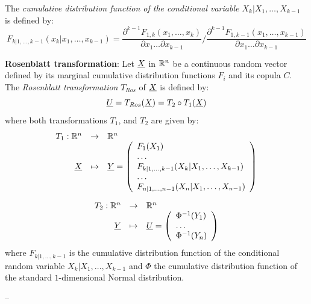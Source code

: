 {  The \emph{cumulative distribution function of the conditional variable  $X_k|X_1, \dots, X_{k-1}$} is defined by:
  \begin{equation}
    F_{k|1, \dots, k-1} (x_k|x_1, \dots, x_{k-1})   =  \displaystyle \frac{\partial^{k-1} F_{1,k}(x_1, \dots, x_k)}{\partial x_1 \dots \partial x_{k-1}} /\frac{\partial^{k-1} F_{1,k-1}(x_1, \dots, x_{k-1})} {\partial x_1 \dots \partial x_{k-1}}
  \end{equation}

  {\bf Rosenblatt transformation}:  Let ${\underline{X}}$ in ${\mathbb R}^n$ be a continuous random vector defined by its marginal cumulative distribution functions $F_i$ and its  copula  $C$. The \emph{Rosenblatt transformation} $T_{Ros}$ of ${\underline{X}}$ is  defined by:
  \begin{equation}\label{usualRos}
    {\underline{U}} = T_{Ros}({\underline{X}})=T_2\circ T_1({\underline{X}})
  \end{equation}
  where both transformations $T_1$, and $T_2$  are given by:
  \begin{equation}\label{usualRosDetailed}
    \begin{array}{rcl}
      T_1 : {\mathbb R}^n & \rightarrow & {\mathbb R}^n\\
      {\underline{X}} & \mapsto & {\underline{Y}}=
      \left(
      \begin{array}{l}
        F_1(X_1)\\
        \dots \\
        F_{k|1, \dots, k-1}(X_k|X_1, \dots, X_{k-1})\\
        \dots \\
        F_{n|1, \dots, n-1}(X_n|X_1, \dots, X_{n-1})
      \end{array}
      \right)
    \end{array}
  \end{equation}

  \begin{equation}\label{usualRosDetailed2}
    \begin{array}{rcl}
      T_2 : {\mathbb R}^n & \rightarrow & {\mathbb R}^n\\
      {\underline{Y}} & \mapsto & {\underline{U}}=
      \left(
      \begin{array}{l}
        \Phi^{-1}(Y_1)\\
        \dots \\
        \Phi^{-1}(Y_n)
      \end{array}
      \right)
    \end{array}
  \end{equation}
  where $F_{k|1, \dots, k-1}$ is the cumulative distribution function of the conditional random variable $X_k|X_1, \dots, X_{k-1}$ and $\Phi$ the cumulative distribution function of the standard $1$-dimensional Normal distribution.\\


}
{
  --}

